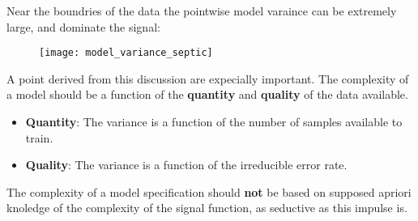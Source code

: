 %
%
\begin{frame}
  Near the boundries of the data the pointwise model varaince can be extremely
  large, and dominate the signal:
  \begin{figure}
    \texttt{[image: model\_variance\_septic]}
  \end{figure}
\end{frame}
%
%
\begin{frame}
  A point derived from this discussion are expecially important.  The complexity
  of a model should be a function of the \textbf{quantity} and \textbf{quality}
  of the data available.
  \begin{itemize}
    \item \textbf{Quantity}: The variance is a function of the number of samples
    available to train.
    \item \textbf{Quality}: The variance is a function of the irreducible error rate.
  \end{itemize}
\end{frame}
%
%
\begin{frame}
  The complexity of a model specification should \textbf{not} be based on
  supposed apriori knoledge of the complexity of the signal function, as
  seductive as this impulse is.
\end{frame}
